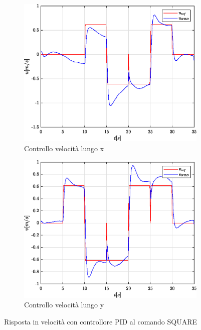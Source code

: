 \begin{figure}
	\centering
	\begin{subfigure}{0.45\textwidth}
		\centering
		\includegraphics[width=1\textwidth]{Simulazioni/Figure/PID/SQUARE/PositionControlXVel}
		\caption{Controllo velocità lungo x}
		\label{fig:SQUAREerrvelxPID}
	\end{subfigure}
	\hfill
	\begin{subfigure}{0.45\textwidth}
		\centering
		\includegraphics[width=1\textwidth]{Simulazioni/Figure/PID/SQUARE/PositionControlYVel}
		\caption{Controllo velocità lungo y}
		\label{fig:SQUAREerrvelyPID}
	\end{subfigure}
	\caption{Risposta in velocità con controllore PID al comando SQUARE}
\end{figure}

